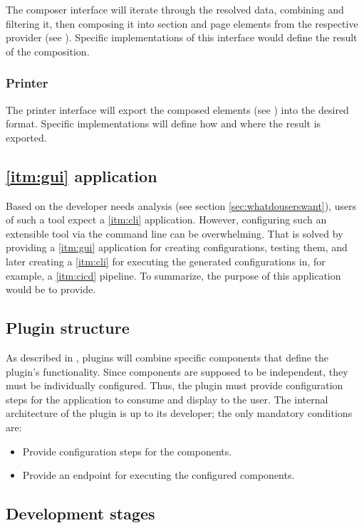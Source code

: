 The composer interface will iterate through the resolved data, combining and filtering it, then composing it into section and page elements from the respective provider (see ).
Specific implementations of this interface would define the result of the composition.

\subsubsection{Printer}

The printer interface will export the composed elements (see ) into the desired format.
Specific implementations will define how and where the result is exported.

\subsection{\ref{itm:gui} application}

Based on the developer needs analysis (see section \ref{sec:whatdouserswant}), users of such a tool expect a \ref{itm:cli} application. However, configuring such an extensible tool via the command line can be overwhelming.
That is solved by providing a \ref{itm:gui} application for creating configurations, testing them, and later creating a \ref{itm:cli} for executing the generated configurations in, for example, a \ref{itm:cicd} pipeline.
To summarize, the purpose of this application would be to provide.

\subsection{Plugin structure}

As described in , plugins will combine specific components that define the plugin's functionality.
Since components are supposed to be independent, they must be individually configured.
Thus, the plugin must provide configuration steps for the application to consume and display to the user.
The internal architecture of the plugin is up to its developer; the only mandatory conditions are:
\begin{itemize}
    \item Provide configuration steps for the components.
    \item Provide an endpoint for executing the configured components.
\end{itemize}

\subsection{Development stages} \label{sec:developmentStages}

